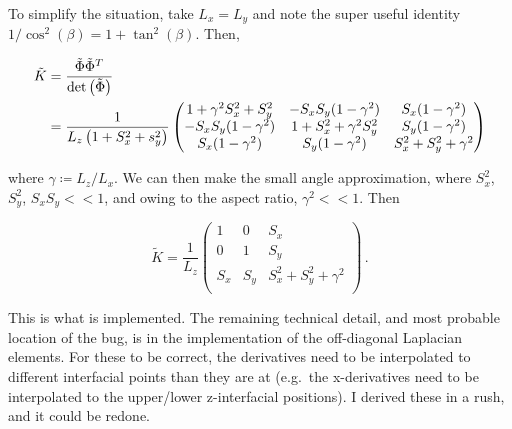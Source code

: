 \documentclass[alpha-refs]{qjrms/wiley-article}
\newcommand{\cbt}{\ensuremath{\cos^2(\beta)}}
\newcommand{\tbt}{\ensuremath{\tan^2(\beta)}}
\begin{document}
To simplify the situation, take $L_x = L_y$ and note the super useful identity
$1/\cbt = 1 + \tbt$.
Then,
\begin{linenomath*}\begin{equation*}
    \begin{aligned}
        \tilde{K}
        &=
        \dfrac{\tilde{\defjac}\tilde{\defjac}^T}{\text{det}\left(\tilde{\defjac}\right)}
        \\
        &= \dfrac{1}{L_z\left(1 + S_x^2+s_y^2\right)}
            \begin{pmatrix}
                1 + \gamma^2 S_x^2 + S_y^2 &
                -S_x S_y(1-\gamma^2) &
                S_x(1-\gamma^2) \\
%
                -S_xS_y(1-\gamma^2) &
                1+S_x^2 + \gamma^2S_y^2 &
                S_y(1-\gamma^2) \\
%
                S_x(1-\gamma^2) &
                S_y(1-\gamma^2) &
                S_x^2 + S_y^2 + \gamma^2 \\
            \end{pmatrix}
    \end{aligned}
\end{equation*}\end{linenomath*}
where $\gamma \coloneqq L_z/L_x$.
We can then make the small angle approximation, where
$S_x^2$, $S_y^2$, $S_xS_y << 1$, and owing to the aspect ratio, $\gamma^2<<1$.
Then
\begin{linenomath*}\begin{equation*}
    \tilde{K} = \dfrac{1}{L_z}
        \begin{pmatrix}
            1 & 0 & S_x \\
            0 & 1 & S_y \\
            S_x & S_y & S_x^2+S_y^2+\gamma^2 \\
        \end{pmatrix} \, .
\end{equation*}\end{linenomath*}
This is what is implemented.
The remaining technical detail, and most probable location of the bug, is in
the implementation of the off-diagonal Laplacian elements.
For these to be correct, the derivatives need to be interpolated to different
interfacial points than they are at (e.g.\ the x-derivatives need to be
interpolated to the upper/lower z-interfacial positions).
I derived these in a rush, and it could be redone.


\end{document}
